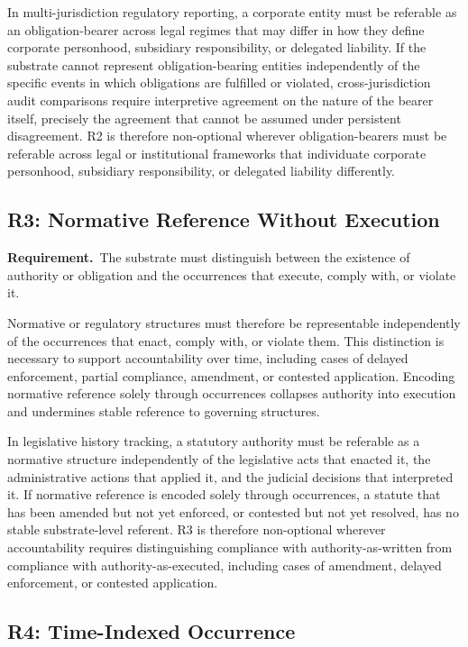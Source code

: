 In multi-jurisdiction regulatory reporting, a corporate entity must be
referable as an obligation-bearer across legal regimes that may differ in
how they define corporate personhood, subsidiary responsibility, or
delegated liability.
If the substrate cannot represent obligation-bearing entities independently
of the specific events in which obligations are fulfilled or violated,
cross-jurisdiction audit comparisons require interpretive agreement on
the nature of the bearer itself, precisely the agreement that cannot
be assumed under persistent disagreement.
R2 is therefore non-optional wherever obligation-bearers must be
referable across legal or institutional frameworks that individuate
corporate personhood, subsidiary responsibility, or delegated
liability differently.

\subsection{R3: Normative Reference Without Execution}

\textbf{Requirement.}~The substrate must distinguish between the existence of authority or
obligation and the occurrences that execute, comply with, or violate it.

Normative or regulatory structures must therefore be representable
independently of the occurrences that enact, comply with, or violate them.
This distinction is necessary to support accountability over time, including
cases of delayed enforcement, partial compliance, amendment, or contested application.
Encoding normative reference solely through occurrences collapses authority
into execution and undermines stable reference to governing structures.

In legislative history tracking, a statutory authority must be referable
as a normative structure independently of the legislative acts that
enacted it, the administrative actions that applied it, and the judicial
decisions that interpreted it.
If normative reference is encoded solely through occurrences, a statute
that has been amended but not yet enforced, or contested but not yet
resolved, has no stable substrate-level referent.
R3 is therefore non-optional wherever accountability requires distinguishing
compliance with authority-as-written from
compliance with authority-as-executed, including cases of
amendment, delayed enforcement, or contested application.

\subsection{R4: Time-Indexed Occurrence}

